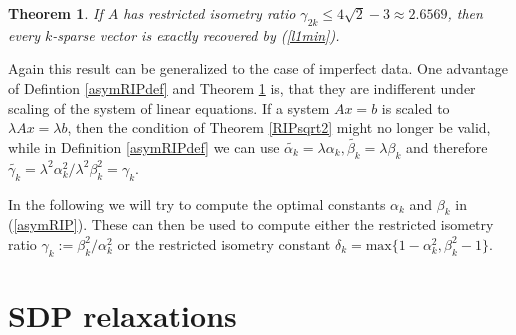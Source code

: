 \documentclass[a4paper,11pt,1p]{elsarticle}
\newtheorem{thm}{Theorem}
\begin{document}
\begin{thm} \label{asymRIPtheorem}
If $A$ has restricted isometry ratio $\gamma_{2k} \leq 4 \sqrt{2} - 3 \approx 2.6569$, then every $k$-sparse vector is exactly recovered by (\ref{l1min}). 
\end{thm}

Again this result can be generalized to the case of imperfect data. One advantage of Defintion \ref{asymRIPdef} and Theorem \ref{asymRIPtheorem} is, that they are indifferent under scaling of the system of linear equations. If a system
$Ax=b$ is scaled to $\lambda Ax = \lambda b$, then the condition of Theorem \ref{RIPsqrt2} might no longer be valid, while in Definition \ref{asymRIPdef} we can use $\tilde{\alpha_k} = \lambda \alpha_k, \tilde{\beta_k} = \lambda \beta_k$
and therefore $\tilde{\gamma_k} = \lambda^2 \alpha_k^2 / \lambda^2
\beta_k^2 = \gamma_k$.

In the following we will try to compute the optimal constants $\alpha_k$ and $\beta_k$ in (\ref{asymRIP}). These can then be used to compute either the restricted isometry ratio $\gamma_k := \beta_k^2 / \alpha_k^2$ or the restricted
isometry constant $\delta_k = \text{max} \{ 1 - \alpha_k^2, \beta_k^2 - 1 \}$.

\section{SDP relaxations}
\end{document}
